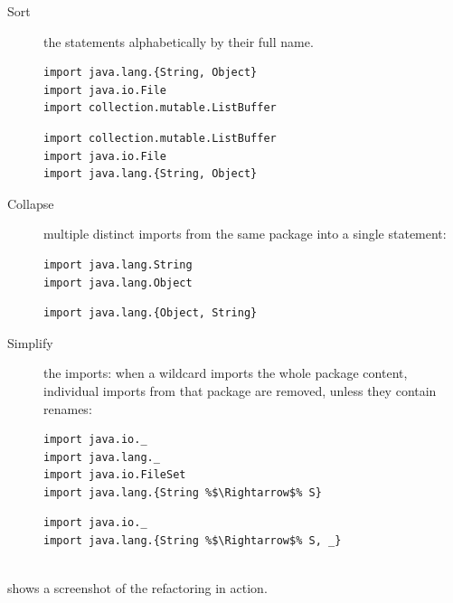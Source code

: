 \documentclass[10pt,a4paper,oneside]{scrreprt}
\begin{document}
\begin{description}
  \item[Sort] the statements alphabetically by their full name.
\begin{multicols}{2}
\begin{lstlisting}
import java.lang.{String, Object}
import java.io.File
import collection.mutable.ListBuffer
\end{lstlisting}
\begin{lstlisting}
import collection.mutable.ListBuffer
import java.io.File
import java.lang.{String, Object}
\end{lstlisting}
\end{multicols}

  \item[Collapse] multiple distinct imports from the same package into a single statement:
\begin{multicols}{2}
\begin{lstlisting}
import java.lang.String
import java.lang.Object
\end{lstlisting}
\begin{lstlisting}
import java.lang.{Object, String}

\end{lstlisting}
\end{multicols}

  \item[Simplify] the imports: when a wildcard imports the whole package content, individual imports from that package are removed, unless they contain renames:
\begin{multicols}{2}
\begin{lstlisting}
import java.io._
import java.lang._
import java.io.FileSet
import java.lang.{String %$\Rightarrow$% S}
\end{lstlisting}
\needspace{\baselineskip}
\begin{lstlisting}
import java.io._
import java.lang.{String %$\Rightarrow$% S, _}


\end{lstlisting}
\end{multicols}
\end{description}

 shows a screenshot of the refactoring in action.
\end{document}
